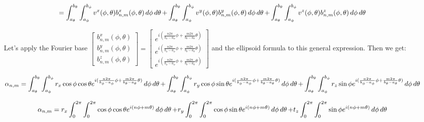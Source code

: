 $$ = \int_{a_\theta}^{b_\theta} \int_{a_\phi}^{b_\phi} v^x(\phi, \theta) b_{n,m}^x(\phi, \theta) \mathop{d\phi} \mathop{d\theta} + 
    \int_{a_\theta}^{b_\theta} \int_{a_\phi}^{b_\phi} v^y(\phi, \theta) b_{n,m}^y(\phi, \theta) \mathop{d\phi} \mathop{d\theta} + 
    \int_{a_\theta}^{b_\theta} \int_{a_\phi}^{b_\phi} v^z(\phi, \theta) b_{n,m}^z(\phi, \theta) \mathop{d\phi} \mathop{d\theta}  
$$

Let's apply the Fourier base $
\begin{bmatrix}
    b_{n,m}^x(\phi, \theta) \\
    b_{n,m}^y(\phi, \theta) \\
    b_{n,m}^z(\phi, \theta)
\end{bmatrix}
=
\begin{bmatrix}
    e^{i(\frac{n 2 \pi}{b_\phi - a_\phi}\phi + \frac{m 2 \pi}{b_\theta - a_\theta} \theta)} \\
    e^{i(\frac{n 2 \pi}{b_\phi - a_\phi}\phi + \frac{m 2 \pi}{b_\theta - a_\theta} \theta)} \\
    e^{i(\frac{n 2 \pi}{b_\phi - a_\phi}\phi + \frac{m 2 \pi}{b_\theta - a_\theta} \theta)} 
\end{bmatrix}
$ and the ellipsoid formula to this general expression. Then we get: 

$$ \alpha_{n,m} =   \int_{a_\theta}^{b_\theta} \int_{a_\phi}^{b_\phi} r_x \cos{\phi} \cos{\theta} e^{i(\frac{n 2 \pi}{b_\phi - a_\phi}\phi + \frac{m 2 \pi}{b_\theta - a_\theta} \theta)} \mathop{d\phi} \mathop{d\theta} + \\
                    \int_{a_\theta}^{b_\theta} \int_{a_\phi}^{b_\phi} r_y \cos{\phi} \sin{\theta} e^{i(\frac{n 2 \pi}{b_\phi - a_\phi}\phi + \frac{m 2 \pi}{b_\theta - a_\theta} \theta)} \mathop{d\phi} \mathop{d\theta} + \\
                    \int_{a_\theta}^{b_\theta} \int_{a_\phi}^{b_\phi} r_z \sin{\phi}              e^{i(\frac{n 2 \pi}{b_\phi - a_\phi}\phi + \frac{m 2 \pi}{b_\theta - a_\theta} \theta)} \mathop{d\phi} \mathop{d\theta}   $$
                
$$ \alpha_{n,m} =   r_x \int_{0}^{2\pi} \int_{0}^{2\pi} \cos{\phi} \cos{\theta} e^{i(n\phi + m\theta)} \mathop{d\phi} \mathop{d\theta} + \\
                    r_y \int_{0}^{2\pi} \int_{0}^{2\pi} \cos{\phi} \sin{\theta} e^{i(n\phi + m\theta)} \mathop{d\phi} \mathop{d\theta} + \\
                    t_z \int_{0}^{2\pi} \int_{0}^{2\pi} \sin{\phi}              e^{i(n\phi + m\theta)} \mathop{d\phi} \mathop{d\theta}   $$
                    
